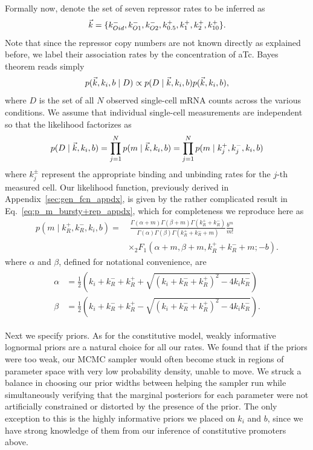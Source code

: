 Formally now, denote the set of seven repressor rates to be inferred as
\begin{equation}
\vec{k} =\{k_{Oid}^-, k_{O1}^-, k_{O2}^-,
k_{0.5}^+, k_{1}^+, k_{2}^+, k_{10}^+\}.
\end{equation}
Note that since the repressor copy numbers are not known directly as explained
before, we label their association rates by the concentration of aTc. Bayes
theorem reads simply
\begin{equation}
p(\vec{k}, k_i, b \mid D)
\propto
p(D \mid\vec{k}, k_i, b) p(\vec{k}, k_i, b),
\end{equation}
where $D$ is the set of all $N$ observed single-cell mRNA counts across the
various conditions. We assume that individual single-cell measurements are
independent so that the likelihood factorizes as
\begin{equation}
p(D \mid\vec{k}, k_i, b)
= \prod_{j=1}^N p(m\mid \vec{k}, k_i, b)
= \prod_{j=1}^N p(m\mid k_j^+, k_j^-, k_i, b)
\end{equation}
where $k_j^\pm$ represent the appropriate binding and unbinding rates for the
$j$-th measured cell. Our likelihood function, previously derived in
Appendix~\ref{sec:gen_fcn_appdx}, is given by the rather complicated result in
Eq.~\ref{eq:p_m_bursty+rep_appdx}, which for completeness we reproduce here as
\begin{equation}
\begin{split}
p(m \mid k_R^+, k_R^-, k_i, b) = & ~\frac{
        \Gamma(\alpha + m)\Gamma(\beta + m)\Gamma(k_R^+ + k_R^-)
        }
        {
        \Gamma(\alpha)\Gamma(\beta)\Gamma(k_R^+ + k_R^- + m)
        }
\frac{b^m}{m!}
\\
&\times {_2F_1}(\alpha+m, \beta+m, k_R^++k_R^-+m; -b).
\end{split}
\label{eq:p_m_bursty+rep}
\end{equation}
where $\alpha$ and $\beta$, defined for notational convenience, are
\begin{align}
\begin{split}
\alpha &= \frac{1}{2}
\left(k_i+k_R^-+k_R^+ + \sqrt{(k_i+k_R^-+k_R^+)^2 - 4k_i k_R^-}\right)
\\
\beta &= \frac{1}{2}
\left(k_i+k_R^-+k_R^+ - \sqrt{(k_i+k_R^-+k_R^+)^2 - 4k_i k_R^-}\right).
\end{split}
\end{align}

Next we specify priors. As for the constitutive model, weakly informative
lognormal priors are a natural choice for all our rates. We found that if the
priors were too weak, our MCMC sampler would often become stuck in regions of
parameter space with very low probability density, unable to move. We struck a
balance in choosing our prior widths between helping the sampler run while
simultaneously verifying that the marginal posteriors for each parameter were
not artificially constrained or distorted by the presence of the prior. The only
exception to this is the highly informative priors we placed on $k_i$ and $b$,
since we have strong knowledge of them from our inference of constitutive
promoters above.

